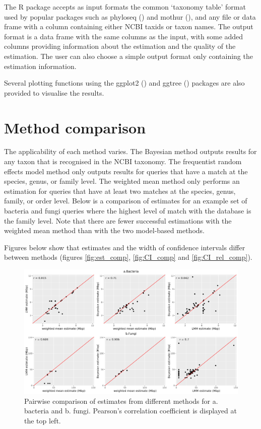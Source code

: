 \documentclass[
]{article}
\begin{document}
The R package accepts as input formats the common `taxonomy table'
format used by popular packages such as phyloseq
() and mothur
(), and
any file or data frame with a column containing either NCBI taxids or
taxon names. The output format is a data frame with the same columns as
the input, with some added columns providing information about the
estimation and the quality of the estimation. The user can also choose a
simple output format only containing the estimation information.

Several plotting functions using the ggplot2
() and ggtree
() packages are also provided to
visualise the results.

\section{Method comparison}\label{method-comparison}

The applicability of each method varies. The Bayesian method outputs
results for any taxon that is recognised in the NCBI taxonomy. The
frequentist random effects model method only outputs results for queries
that have a match at the species, genus, or family level. The weighted
mean method only performs an estimation for queries that have at least
two matches at the species, genus, family, or order level. Below is a
comparison of estimates for an example set of bacteria and fungi queries
where the highest level of match with the database is the family level.
Note that there are fewer successful estimations with the weighted mean
method than with the two model-based methods.

Figures below show that estimates and the width of confidence intervals
differ between methods (figures \autoref{fig:est_comp},
\autoref{fig:CI_comp} and \autoref{fig:CI_rel_comp}).

\begin{figure}
\centering
\includegraphics[width=1\textwidth,height=\textheight]{compare_estimates.png}
\caption{Pairwise comparison of estimates from different methods for a.
bacteria and b. fungi. Pearson's correlation coefficient is displayed at
the top left.\label{fig:est_comp}}
\end{figure}
\end{document}
